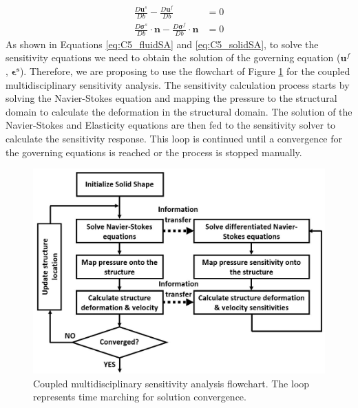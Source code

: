%
%
\begin{subequations}\label{eq:C5_FSIconstraintsSA}
\begin{align}
	\frac{D \mathbf{u}^s}{D b} - 
	\frac{D \mathbf{u}^f}{D b} &= 0
	\\
	\frac{D \mathbf{\sigma}^s}{D b} \cdot \mathbf{n} - 
	\frac{D \mathbf{\sigma}^f}{D b} \cdot \mathbf{n} &= 0
\end{align}
\end{subequations}
%
As shown in Equations \eqref{eq:C5_fluidSA} and \eqref{eq:C5_solidSA}, to solve the sensitivity equations we need to obtain the solution of the governing equation ($\mathbf{u}^f$, $\mathbf{\epsilon^s}$). Therefore, we are proposing to use the flowchart of Figure \ref{fig:C5_SAflowchart} for the coupled multidisciplinary sensitivity analysis. The sensitivity calculation process starts by solving the Navier-Stokes equation and mapping the pressure to the structural domain to calculate the deformation in the structural domain. The solution of the Navier-Stokes and Elasticity equations are then fed to the sensitivity solver to calculate the sensitivity response. This loop is continued until a convergence for the governing equations is reached or the process is stopped manually. 
%
\begin{figure}[H]
    \centering
    \includegraphics[width=14.00cm]{Chapter_5/figure/couple_SA_flowchart.jpg}
    \caption{Coupled multidisciplinary sensitivity analysis flowchart. The loop represents time marching for solution convergence.}
    \label{fig:C5_SAflowchart}
\end{figure}
%